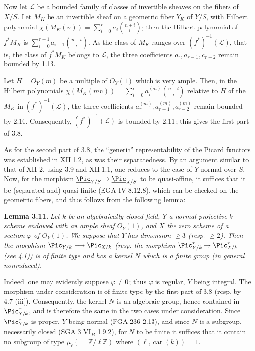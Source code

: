 Now let \(\mathcal L\) be a bounded family of classes of invertible sheaves on the fibers of \(X/S\). Let \(M_K\) be an invertible sheaf on a geometric fiber \(Y_K\) of \(Y/S\), with Hilbert polynomial \(\chi(M_K(n))=\sum_{i=0}^{r}a_i\binom{n+i}{i}\); then the Hilbert polynomial of \(f^*M_K\) is \(\sum_{i=0}^{r-1}a_{i+1}\binom{n+i}{i}\). As the class of \(M_K\) ranges over \((f^*)^{-1}(\mathcal L)\), that is, the
%
class of \(f^*M_K\) belongs to \(\mathcal L\), the three coefficients \(a_r,a_{r-1},a_{r-2}\) remain bounded by 1.13.

Let \(H={O}_Y(m)\) be a multiple of \({O}_Y(1)\) which is very ample. Then, in the Hilbert polynomials \(\chi(M_K(mn))=\sum_{i=0}^{r}a_i^{(m)}\binom{n+i}{i}\) relative to \(H\) of the \(M_K\) in \((f^*)^{-1}(\mathcal L)\), the three coefficients \(a_r^{(m)},a_{r-1}^{(m)},a_{r-2}^{(m)}\) remain bounded by 2.10. Consequently, \((f^*)^{-1}(\mathcal L)\) is bounded by 2.11\,; this gives the first part of 3.8.

As for the second part of 3.8, the ``generic'' representability of the Picard functors was established in XII 1.2, as was their separatedness. By an argument similar to that of XII 2, using 3.9 and XII 1.1, one reduces to the case of \(Y\) normal over \(S\). Now, for the morphism \(\underline{\Pic}_{Y/S}\to\underline{\Pic}_{X/S}\) to be quasi-affine, it suffices that it be (separated and) quasi-finite (EGA IV 8.12.8), which can be checked on the geometric fibers, and thus follows from the following lemma:

\textbf{Lemma 3.11.} \emph{Let \(k\) be an algebraically closed field, \(Y\) a normal projective \(k\)-scheme endowed with an ample sheaf \({O}_Y(1)\), and \(X\) the zero scheme of a section \(\varphi\) of \({O}_Y(1)\). We suppose that \(Y\) has dimension \(\ge3\) (resp. \(\ge2\)). Then the morphism \(\Pic_{Y/k}\longrightarrow\Pic_{X/k}\) (resp. the morphism \(\Pic^\tau_{Y/k}\to\Pic^\tau_{X/k}\) (see 4.1)) is of finite type and has a kernel \(N\) which is a finite group (in general nonreduced).}

Indeed, one may evidently suppose \(\varphi\ne0\)\,; thus \(\varphi\) is regular, \(Y\) being integral. The morphism under consideration is of finite type by the first part of 3.8 (resp. by 4.7 (iii)). Consequently, the kernel \(N\) is an algebraic group, hence contained in \(\Pic^\tau_{Y/k}\), and is therefore the same
%
in the two cases under consideration. Since \(\Pic^\tau_{Y/k}\) is proper, \(Y\) being normal (FGA 236-2.13), and since \(N\) is a subgroup, necessarily closed (SGA 3 VI\(_B\) 1.9.2), for \(N\) to be finite it suffices that it contain no subgroup of type \(\mu_\ell(=\mathbb Z/\ell\mathbb Z)\) where \((\ell,\operatorname{car}(k))=1\).

